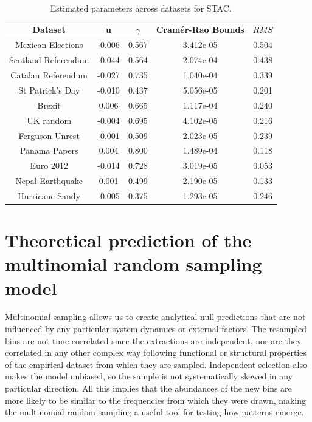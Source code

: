 \begin{table}[t] 
\caption[$\,$ STAC: Estimated parameters]{Estimated parameters across datasets for STAC.}
\centering
\begin{tabular}{c c c c c} 
\hline 
Dataset & u & $\gamma$ & Cramér-Rao Bounds & $RMS$  \\ \hline \hline
Mexican Elections & -0.006 & 0.567 & 3.412e-05 & 0.504  \\ \hline 
Scotland Referendum & -0.044 & 0.564 & 2.074e-04 & 0.438  \\ \hline 
Catalan Referendum & -0.027 & 0.735 & 1.040e-04 & 0.339  \\ \hline 
St Patrick's Day & -0.010 & 0.437 & 5.056e-05 & 0.201  \\ \hline 
Brexit & 0.006 & 0.665 & 1.117e-04 & 0.240  \\ \hline 
UK random & -0.004 & 0.695 & 4.102e-05 & 0.216  \\ \hline 
Ferguson Unrest & -0.001 & 0.509 & 2.023e-05 & 0.239  \\ \hline 
Panama Papers & 0.004 & 0.800 & 1.489e-04 & 0.118  \\ \hline 
Euro 2012 & -0.014 & 0.728 & 3.019e-05 & 0.053  \\ \hline 
Nepal Earthquake & 0.001 & 0.499 & 2.190e-05 & 0.133  \\ \hline 
Hurricane Sandy & -0.005 & 0.375 & 1.293e-05 & 0.246  \\ \hline 
\end{tabular} \label{tab:STAC}
\end{table} 

 \newpage
\section{Theoretical prediction of the multinomial random sampling model \label{appen:patterns:eqs}}
 Multinomial sampling allows us to create analytical null predictions that are not influenced by any particular system dynamics or external factors. The  resampled bins are not time-correlated since the extractions are independent, nor are they correlated in any other complex way following functional or structural properties of the empirical dataset from which they are sampled. Independent selection also makes the model unbiased, so the sample is not systematically skewed in any particular direction. All this implies that the abundances of the new bins are more likely to be similar to the frequencies from which they were drawn, making the multinomial random sampling a useful tool for testing how patterns emerge.\\

